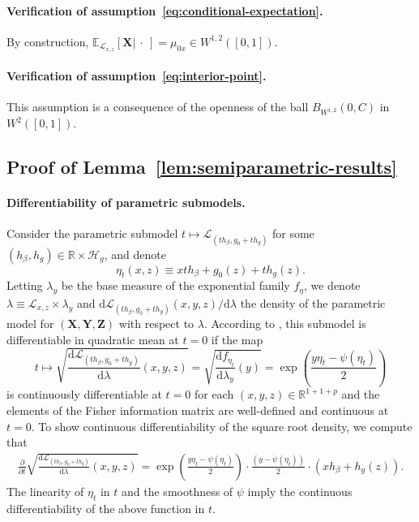 \documentclass[12pt]{article}
\theoremstyle{definition}
\theoremstyle{remark}
\newcommand{\E}{\mathbb E}								%
\newcommand{\R}{\mathbb{R}}								%
\newcommand{\prx}{\bm X}								%
\newcommand{\prz}{\bm Z}								%
\newcommand{\pry}{{\bm Y}}								%
\newcommand{\law}{\mathcal L}							%
\renewcommand{\H}{\mathcal H}		 					%
\begin{document}
\paragraph{Verification of assumption~\eqref{eq:conditional-expectation}.}

By construction, $\E_{\law_{x,z}}[\prx |\ \cdot\ ] = \mu_{0x} \in W^{1,2}([0,1])$.

\paragraph{Verification of assumption~\eqref{eq:interior-point}.} This assumption is a consequence of the openness of the ball $B_{W^{1,2}}(0, C)$ in $W^2([0,1])$.

\subsection{Proof of Lemma~\ref{lem:semiparametric-results}} \label{sec:proof-of-lemma-9}

\paragraph{Differentiability of parametric submodels.}

Consider the parametric submodel $t \mapsto \law_{(th_\beta, g_0 + th_g)}$ for some $(h_\beta, h_g) \in \R \times \H_g$, and denote 
\begin{equation*}
\eta_t(x, z) \equiv x th_\beta+g_0(z)+th_g(z). 
\end{equation*}
Letting $\lambda_{y}$ be the base measure of the exponential family $f_\eta$, we denote $\lambda \equiv \law_{x,z} \times \lambda_{y}$ and $\mathrm d \law_{(th_\beta, g_0 + th_g)}(x, y, z)/\mathrm d \lambda$ the density of the parametric model for $(\prx, \pry, \prz)$ with respect to $\lambda$. According to \citet[Lemma 7.6]{VDV1998}, this submodel is differentiable in quadratic mean at $t = 0$ if the map 
\begin{equation*}
t \mapsto \sqrt{\frac{\mathrm d \law_{(th_\beta, g_0 + th_g)}}{\mathrm d\lambda}(x, y, z)} = \sqrt{\frac{\mathrm df_{\eta_t}}{\mathrm d\lambda_y}(y)} = \exp\left(\frac{y\eta_t-\psi(\eta_t)}{2}\right)
\end{equation*}
is continuously differentiable at $t = 0$ for each $(x,  y, z) \in \R^{1 + 1 + p}$ and the elements of the Fisher information matrix are well-defined and continuous at $t = 0$. To show continuous differentiability of the square root density, we compute that
\begin{align*}
	\frac{\partial}{\partial t}\sqrt{\frac{\mathrm d \law_{(th_\beta, g_0 + th_g)}}{\mathrm d\lambda}(x, y, z)} = \exp\left(\frac{y\eta_t-\psi(\eta_t)}{2}\right)\cdot\frac{(y-\dot{\psi}(\eta_t))}{2}\cdot (xh_\beta + h_g(z)).
\end{align*}
The linearity of $\eta_t$ in $t$ and the smoothness of $\psi$ imply the continuous differentiability of the above function in $t$.
\end{document}

